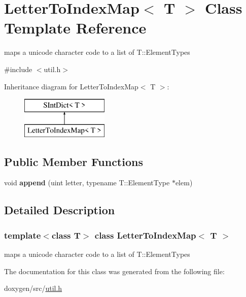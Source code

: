 \hypertarget{class_letter_to_index_map}{}\section{Letter\+To\+Index\+Map$<$ T $>$ Class Template Reference}
\label{class_letter_to_index_map}


maps a unicode character code to a list of T\+::\+Element\+Type\textquotesingle{}s  




{\ttfamily \#include $<$util.\+h$>$}

Inheritance diagram for Letter\+To\+Index\+Map$<$ T $>$\+:\begin{figure}[H]
\begin{center}
\leavevmode
\includegraphics[height=2.000000cm]{class_letter_to_index_map}
\end{center}
\end{figure}
\subsection*{Public Member Functions}
\begin{DoxyCompactItemize}
\item 
\mbox{\label{class_letter_to_index_map_a4829c6e2d03220a17da913790b6a597a}} 
void {\bfseries append} (uint letter, typename T\+::\+Element\+Type $\ast$elem)
\end{DoxyCompactItemize}


\subsection{Detailed Description}
\subsubsection*{template$<$class T$>$\newline
class Letter\+To\+Index\+Map$<$ T $>$}

maps a unicode character code to a list of T\+::\+Element\+Type\textquotesingle{}s 

The documentation for this class was generated from the following file\+:\begin{DoxyCompactItemize}
\item 
doxygen/src/\mbox{\hyperlink{util_8h}{util.\+h}}\end{DoxyCompactItemize}
